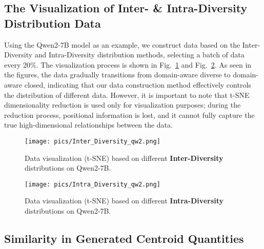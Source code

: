 \subsection{The Visualization of Inter- \& Intra-Diversity Distribution Data}
\label{sec:appendix-div-tsne}

Using the Qwen2-7B model as an example, we construct data based on the Inter-Diversity and Intra-Diversity distribution methods, selecting a batch of data every 20\%. The visualization process is shown in Fig.~\ref{fig:inter-diversity-tsne} and Fig.~\ref{fig:intra-diversity-tsne}. As seen in the figures, the data gradually transitions from domain-aware diverse to domain-aware closed, indicating that our data construction method effectively controls the distribution of different data. However, it is important to note that t-SNE dimensionality reduction is used only for visualization purposes; during the reduction process, positional information is lost, and it cannot fully capture the true high-dimensional relationships between the data.

\begin{figure}[h]
\centering
\texttt{[image: pics/Inter\_Diversity\_qw2.png]}
\vspace{-0.6cm}
\caption{Data visualization (t-SNE) based on different \textbf{Inter-Diversity} distributions on Qwen2-7B.}
\label{fig:inter-diversity-tsne}
\end{figure}

\begin{figure}[h]
\centering
\texttt{[image: pics/Intra\_Diversity\_qw2.png]}
\vspace{-0.6cm}
\caption{Data visualization (t-SNE) based on different \textbf{Intra-Diversity} distributions on Qwen2-7B.}
\label{fig:intra-diversity-tsne}
\end{figure}

\subsection{Similarity in Generated Centroid Quantities}
\label{sec:appendix-centroids-gen}

